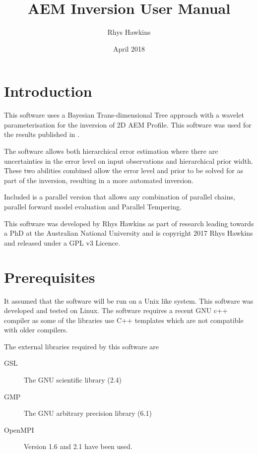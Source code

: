 \documentclass[a4paper,12pt]{article}
\begin{document}
\title{AEM Inversion User Manual}
\author{Rhys Hawkins}
\date{April 2018}

\maketitle

\tableofcontents

\section{Introduction}

This software uses a Bayesian Trans-dimensional Tree\citep{Hawkins:2015:A} approach with a
wavelet parameterisation for the inversion of 2D AEM Profile. This software
was used for the results published in \citet{Hawkins:2017:A}.


The software allows both hierarchical error estimation where there are
uncertainties in the error level on input observations and
hierarchical prior width. These two abilities combined allow the error
level and prior to be solved for as part of the inversion, resulting
in a more automated inversion.

Included is a parallel version that allows any combination of parallel
chains, parallel forward model evaluation and Parallel
Tempering\citep{Sambridge:2014:A}.

This software was developed by Rhys Hawkins as part of research leading
towards a PhD\citep{Hawkins:2018:A} at the Australian National University
and is copyright 2017 Rhys Hawkins and released under a GPL v3 Licence.

\section{Prerequisites}

It assumed that the software will be run on a Unix like system. This
software was developed and tested on Linux. The software requires a
recent GNU c++ compiler as some of the libraries use C++ templates
which are not compatible with older compilers.

The external libraries required by this software are

\begin{description}
\item[GSL] The GNU scientific library (2.4)
\item[GMP] The GNU arbitrary precision library (6.1)
\item[OpenMPI] Version 1.6 and 2.1 have been used.
\end{description}
\end{document}

